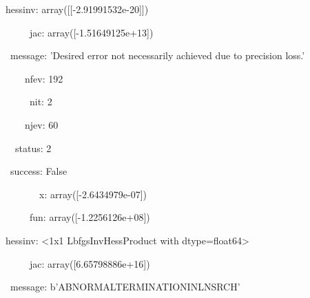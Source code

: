 \documentclass[12pt]{article}
\renewcommand{\_}{\kern-1.5pt\textunderscore\kern-1.5pt}
\begin{document}
{\fontsize{10pt}{12.0pt}\selectfont  hess\_inv: array([[-2.91991532e-20]])\par}\par

{\fontsize{10pt}{12.0pt}\selectfont \ \ \ \ \  jac: array([-1.51649125e+13])\par}\par

{\fontsize{10pt}{12.0pt}\selectfont \  message: 'Desired error not necessarily achieved due to precision loss.'\par}\par

{\fontsize{10pt}{12.0pt}\selectfont \ \ \ \  nfev: 192\par}\par

{\fontsize{10pt}{12.0pt}\selectfont \ \ \ \ \  nit: 2\par}\par

{\fontsize{10pt}{12.0pt}\selectfont \ \ \ \  njev: 60\par}\par

{\fontsize{10pt}{12.0pt}\selectfont \ \  status: 2\par}\par

{\fontsize{10pt}{12.0pt}\selectfont \  success: False\par}\par

{\fontsize{10pt}{12.0pt}\selectfont \ \ \ \ \ \ \  x: array([-2.6434979e-07])\par}\par

{\fontsize{10pt}{12.0pt}\selectfont \ \ \ \ \  fun: array([-1.2256126e+08])\par}\par

{\fontsize{10pt}{12.0pt}\selectfont  hess\_inv: <1x1 LbfgsInvHessProduct with dtype=float64>\par}\par

{\fontsize{10pt}{12.0pt}\selectfont \ \ \ \ \  jac: array([6.65798886e+16])\par}\par

{\fontsize{10pt}{12.0pt}\selectfont \  message: b'ABNORMAL\_TERMINATION\_IN\_LNSRCH'\par}\par
\end{document}

